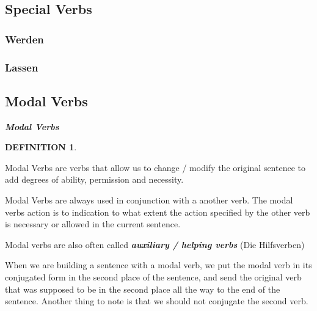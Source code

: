 \documentclass[a4paper,twocolumn,10pt]{article}
\newtheorem{mydef}{DEFINITION}[section]
\newcommand{\newpar}
{\par \vspace{0.3cm}}
\newcommand{\subsectionend}
{
\nolinenumbers
\linenumbers
}
\newcommand{\subsubsectionend}
{
\nolinenumbers
\linenumbers
}
\newcommand{\tcolorboxstart}
{
	\nolinenumbers
	\vspace{0.2cm}
	\centering
}
\newcommand{\tcolorboxend}
{
	\justifying
	\vspace{0.2cm}
	\linenumbers
}
\newcommand{\tcolorboxdefinition}[3]
{

\tcolorboxstart
\begin{defn-bg}

	\begin{defn-title}[width=7cm]{}
	{
		\normalsize \textbf{\textit{#1}}
	}
	\end{defn-title}

	\begin{defn-theword}
	{
		\footnotesize
		\begin{mydef} #2
		\end{mydef}
	}
	\end{defn-theword}


	\begin{defn-content}

	\justify
	#3

	\end{defn-content}

\end{defn-bg}
\tcolorboxend
}
\begin{document}

\subsectionend

\subsection{Special Verbs}
\label{ssec:special_verbs}

\subsubsection{Werden}
\label{sssec:werden}



\subsubsectionend
\subsubsection{Lassen}
\label{sssec:lassen}



\subsubsectionend



\subsectionend

\subsection{Modal Verbs}
\label{ssec:modal_verbs}


\tcolorboxdefinition
{Modal Verbs}
{\label{def:modal_verbs}}
{

Modal Verbs are verbs that allow us to change / modify the original sentence to
add degrees of ability, permission and necessity.


}


Modal Verbs are always used in conjunction with a another verb. The modal verbs
action is to indication to what extent the action specified by the other verb is
necessary or allowed in the current sentence.\newpar

Modal verbs are also often called \textbf{\textit{auxiliary / helping verbs}}
(Die Hilfsverben)\newpar

When we are building a sentence with a modal verb, we put the modal verb in its
conjugated form in the second place of the sentence, and send the original verb
that was supposed to be in the second place all the way to the end of the
sentence. Another thing to note is that we should not conjugate the second
verb.\newpar
\end{document}
